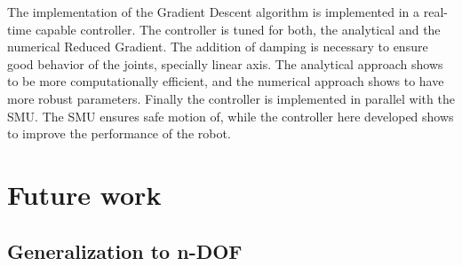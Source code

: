 The implementation of the Gradient Descent algorithm is implemented in a real-time capable controller. The controller is tuned for both, the analytical and the numerical Reduced Gradient. The addition of damping is necessary to ensure good behavior of the joints, specially linear axis. The analytical approach shows to be more computationally efficient, and the numerical approach shows to have more robust parameters.
Finally the controller is implemented in parallel with the SMU. The SMU ensures safe motion of, while the controller here developed shows to improve the performance of the robot.




\section{Future work}
\label{sec:future_work}

\subsection{Generalization to n-DOF}
\label{subsec:extension_ndof}

